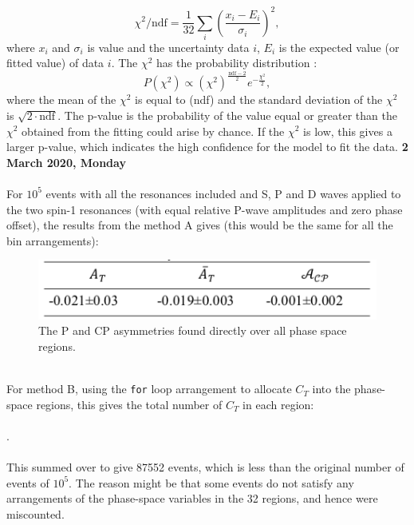 \begin{equation}
    \chi^2/\text{ndf} = \frac{1}{32}\sum_i\left(\frac{x_i-E_i}{\sigma_i}\right)^2,
\end{equation}
where $x_i$ and $\sigma_i$ is value and the uncertainty data $i$, $E_i$ is the expected value (or fitted value) of data $i$. The $\chi^2$ has the probability distribution \autocite{pvalue}:
\begin{equation}
    P(\chi^2) \propto (\chi^2)^{\frac{\text{ndf}-2}{2}}e^{-\frac{\chi^2}{2}},
\end{equation}
where the mean of the $\chi^2$ is equal to (ndf) and the standard deviation of the $\chi^2$ is $\sqrt{2\cdot\text{ndf}}$. The p-value is the probability of the value equal or greater than the $\chi^2$ obtained from the fitting could arise by chance. If the $\chi^2$ is low, this gives a larger p-value, which indicates the high confidence for the model to fit the data.
\clearpage
\noindent\textbf{2 March 2020, Monday}
\\
\\
For $10^5$ events with all the resonances included and S, P and D waves applied to the two spin-1 resonances (with equal relative P-wave amplitudes and zero phase offset), the results from the method A gives (this would be the same for all the bin arrangements):
\begin{figure}[h]
\center
\includegraphics*[width=0.46\linewidth]{binnedanalysis/asy_all_ps}
\caption{The P and CP asymmetries found directly over all phase space regions.}
\label{asy_all_ps}
\end{figure}
\\
For method B, using the \texttt{for} loop arrangement to allocate $C_T$ into the phase-space regions, this gives the total number of $C_T$ in each region:
\\
\\
\seqsplit{$[1422, 897, 1402, 905, 1387, 911, 1400, 905, 1401, 902, 1372, 911, 1400, 907, 1415, 899, 1458, 884, 1429, 893, 1395, 906, 1421, 892, 1444, 883, 1355, 920, 1380, 916, 1407, 902, 1222, 1940, 1204, 1969, 1187, 1973, 1199, 1965, 1203, 1977, 1187, 1991, 1198, 1971, 1205, 1952, 1237, 1907, 1222, 1932, 1192, 1966, 1211, 1937, 1224, 1923, 1178, 2012, 1185, 2002, 1201, 1959]$}.
\\
\\
This summed over to give 87552 events, which is less than the original number of events of $10^5$. The reason might be that some events do not satisfy any arrangements of the phase-space variables in the 32 regions, and hence were miscounted.

